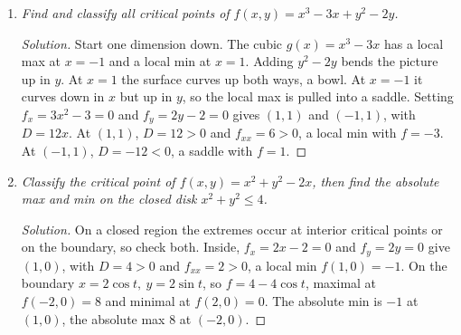 \documentclass[12pt]{article}
\newenvironment{solution}
  {\renewcommand\qedsymbol{$\blacksquare$}\begin{proof}[Solution]}
  {\end{proof}}
\begin{document}
\begin{enumerate}
\begin{enumerate}
    \begin{solution}
    Every critical point is a max, a min, or a saddle, sorted by looking at the slices.
    \begin{itemize}\itemsep2pt
      \item $z=x^2+y^2$ is a round bowl. Every slice through the bottom is an upward parabola, a minimum, with circular level curves and no special direction.
      \item $z=x^2+3y^2$ is the same bowl squashed. Still a minimum, but gentle along $x$ and steep along $y$. Two perpendicular special directions appear.
      \item $z=2x^2+2xy+2y^2$ is that bowl rotated $45^\circ$. Still a minimum, but the special directions now lie on the diagonals. The $xy$ term causes the rotation. Without it the special directions are the axes.
      \item $z=x^2-y^2$ is the saddle. Up along $x$, down along $y$, neither a max nor a min. The lines $y=\pm x$ split high from low.
      \item The dome $z=1-x^2-y^2$ is the round bowl flipped, a maximum, the circular case.
    \end{itemize}
    The determinant test reads these shapes back as numbers. $D>0$ with $f_{xx}>0$ is a bowl, $D>0$ with $f_{xx}<0$ a dome, $D<0$ a saddle. The cross term $f_{xy}$ measures how far the special directions have rotated off the axes.
    \end{solution}

    \item \textit{Find and classify all critical points of $f(x,y)=x^3-3x+y^2-2y$.}

    \begin{solution}
    Start one dimension down. The cubic $g(x)=x^3-3x$ has a local max at $x=-1$ and a local min at $x=1$. Adding $y^2-2y$ bends the picture up in $y$. At $x=1$ the surface curves up both ways, a bowl. At $x=-1$ it curves down in $x$ but up in $y$, so the local max is pulled into a saddle. Setting $f_x=3x^2-3=0$ and $f_y=2y-2=0$ gives $(1,1)$ and $(-1,1)$, with $D=12x$. At $(1,1)$, $D=12>0$ and $f_{xx}=6>0$, a local min with $f=-3$. At $(-1,1)$, $D=-12<0$, a saddle with $f=1$.
    \end{solution}

    \item \textit{Classify the critical point of $f(x,y)=x^2+y^2-2x$, then find the absolute max and min on the closed disk $x^2+y^2\le4$.}

    \begin{solution}
    On a closed region the extremes occur at interior critical points or on the boundary, so check both. Inside, $f_x=2x-2=0$ and $f_y=2y=0$ give $(1,0)$, with $D=4>0$ and $f_{xx}=2>0$, a local min $f(1,0)=-1$. On the boundary $x=2\cos t,\ y=2\sin t$, so $f=4-4\cos t$, maximal at $f(-2,0)=8$ and minimal at $f(2,0)=0$. The absolute min is $-1$ at $(1,0)$, the absolute max $8$ at $(-2,0)$.
    \end{solution}


\end{enumerate}
\end{enumerate}
\end{document}
